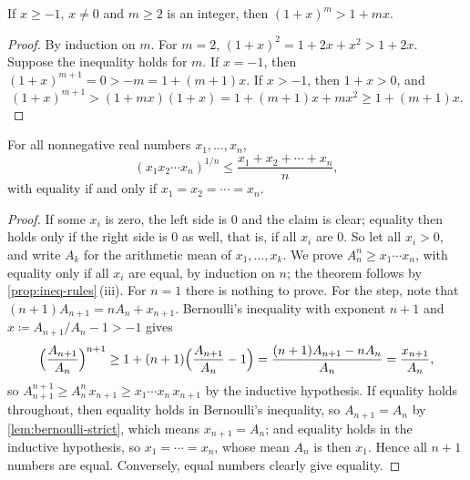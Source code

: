 \begin{lemma}
\label{lem:bernoulli-strict}
If $x\ge-1$, $x\ne0$ and $m\ge2$ is an integer, then $(1+x)^m>1+mx$.
\end{lemma}

\begin{proof}
By induction on $m$. For $m=2$, $(1+x)^2=1+2x+x^2>1+2x$. Suppose the inequality holds for $m$. If $x=-1$, then $(1+x)^{m+1}=0>-m=1+(m+1)x$. If $x>-1$, then $1+x>0$, and
\[
(1+x)^{m+1}>(1+mx)(1+x)=1+(m+1)x+mx^2\ge1+(m+1)x .
\]
\end{proof}

\begin{theorem}
\label{thm:amgm}
For all nonnegative real numbers $x_1,\ldots,x_n$,
\[
(x_1x_2\cdots x_n)^{1/n}\le\frac{x_1+x_2+\cdots+x_n}n ,
\]
with equality if and only if $x_1=x_2=\cdots=x_n$.
\end{theorem}

\begin{proof}
If some $x_i$ is zero, the left side is $0$ and the claim is clear; equality then holds only if the right side is $0$ as well, that is, if all $x_i$ are $0$. So let all $x_i>0$, and write $A_k$ for the arithmetic mean of $x_1,\ldots,x_k$. We prove $A_n^n\ge x_1\cdots x_n$, with equality only if all $x_i$ are equal, by induction on $n$; the theorem follows by \cref{prop:ineq-rules}\,(iii). For $n=1$ there is nothing to prove. For the step, note that $(n+1)A_{n+1}=nA_n+x_{n+1}$. Bernoulli's inequality with exponent $n+1$ and $x\coloneqq A_{n+1}/A_n-1>-1$ gives
\[
\Bigl(\frac{A_{n+1}}{A_n}\Bigr)^{n+1}\ge1+(n+1)\Bigl(\frac{A_{n+1}}{A_n}-1\Bigr)=\frac{(n+1)A_{n+1}-nA_n}{A_n}=\frac{x_{n+1}}{A_n},
\]
so $A_{n+1}^{n+1}\ge A_n^n\,x_{n+1}\ge x_1\cdots x_n\,x_{n+1}$ by the inductive hypothesis. If equality holds throughout, then equality holds in Bernoulli's inequality, so $A_{n+1}=A_n$ by \cref{lem:bernoulli-strict}, which means $x_{n+1}=A_n$; and equality holds in the inductive hypothesis, so $x_1=\cdots=x_n$, whose mean $A_n$ is then $x_1$. Hence all $n+1$ numbers are equal. Conversely, equal numbers clearly give equality.
\end{proof}


